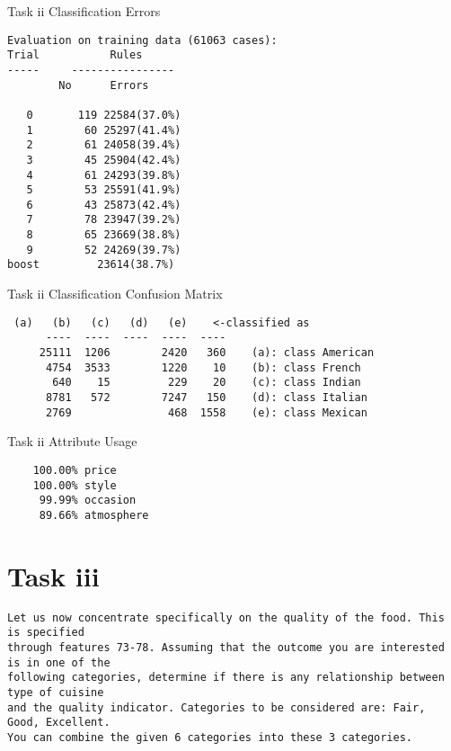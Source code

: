 \documentclass[letterpaper,10pt]{article}
\begin{document}
\begin{table}[H]
\centering
\setlength\tabcolsep{2pt}
\begin{minipage}{0.38\textwidth}
\caption{Task ii Classification Errors}
\begin{verbatim}
Evaluation on training data (61063 cases):
Trial	        Rules     
-----	  ----------------
	    No      Errors

   0	   119 22584(37.0%)
   1	    60 25297(41.4%)
   2	    61 24058(39.4%)
   3	    45 25904(42.4%)
   4	    61 24293(39.8%)
   5	    53 25591(41.9%)
   6	    43 25873(42.4%)
   7	    78 23947(39.2%)
   8	    65 23669(38.8%)
   9	    52 24269(39.7%)
boost	      23614(38.7%) 
\end{verbatim}
\label{tab:tii_err} 
\end{minipage}%
\begin{minipage}{0.68\textwidth}
\caption{Task ii Classification Confusion Matrix} 
\begin{verbatim}
 (a)   (b)   (c)   (d)   (e)    <-classified as
	  ----  ----  ----  ----  ----
	 25111  1206        2420   360    (a): class American
	  4754  3533        1220    10    (b): class French
	   640    15         229    20    (c): class Indian
	  8781   572        7247   150    (d): class Italian
	  2769               468  1558    (e): class Mexican
\end{verbatim}
 \label{tab:tii_cm} 
\end{minipage} 
\begin{minipage}{0.48\textwidth}
\centering
\caption{Task ii Attribute Usage} 
\begin{verbatim}
	100.00%	price
	100.00%	style
	 99.99%	occasion
	 89.66%	atmosphere
\end{verbatim}
 \label{tab:tii_au} 
\end{minipage}
\end{table}
\clearpage
\newpage
{}
\section*{Task iii}
\begin{verbatim}
Let us now concentrate specifically on the quality of the food. This is specified
through features 73-78. Assuming that the outcome you are interested is in one of the
following categories, determine if there is any relationship between type of cuisine
and the quality indicator. Categories to be considered are: Fair, Good, Excellent.
You can combine the given 6 categories into these 3 categories.
\end{verbatim}
\end{document}

